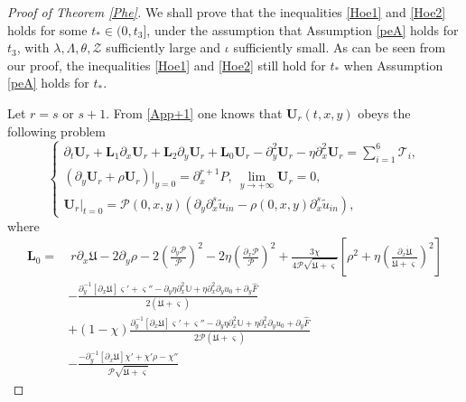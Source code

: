 \documentclass{amsart}
\numberwithin{equation}{section}
\begin{document}
\begin{proof}[Proof of Theorem \ref{Phe}]

We shall prove that the inequalities \eqref{Hoe1} and \eqref{Hoe2} holds for some $t_{*}\in (0,t_{3}]$, under the assumption that Assumption \ref{peA} holds for $t_{3}$, with $\lambda,\Lambda, \theta, \mathcal{Z}$ sufficiently large and $\iota$ sufficiently small. As can be seen from our proof, the inequalities \eqref{Hoe1} and \eqref{Hoe2} still hold for $t_{*}$ when Assumption \ref{peA} holds for $t_{*}$.

Let $r=s$ or $s+1$. From \eqref{App+1} one knows that $\mathbf{U}_{r}(t,x,y)$ obeys the following problem
\begin{equation}\label{Un}
\begin{cases}
\partial_{t}\mathbf{U}_{r}
+\mathbf{L}_{1}\partial_{x}\mathbf{U}_{r}
+\mathbf{L}_{2}\partial_{y}\mathbf{U}_{r}
+\mathbf{L}_{0}\mathbf{U}_{r}
-\partial_{y}^{2}\mathbf{U}_{r}
-\eta\partial_{x}^{2}\mathbf{U}_{r}
=\sum\limits_{i=1}^{6}\mathcal{T}_{i},\\
\left(\partial_{y}\mathbf{U}_{r}+\rho\mathbf{U}_{r}\right)|_{y=0}=\partial_{x}^{r+1}P,~
\lim\limits_{y\to+\infty} \mathbf{U}_{r}=0,\\
\mathbf{U}_{r}|_{t=0}=\mathcal{P}(0,x,y)(\partial_{y}\partial_{x}^{s}\tilde{u}_{in}-\rho(0,x,y)\partial_{x}^{s}\tilde{u}_{in}),
\end{cases}
\end{equation}
where
\begin{align*}
\mathbf{L}_{0}
=&~r\partial_{x}\mathfrak{U}-2\partial_{y}\rho
  -2\left(\frac{\partial_{y}\mathcal{P}}{\mathcal{P}}\right)^{2}-2\eta\left(\frac{\partial_{x}\mathcal{P}}{\mathcal{P}}\right)^{2}
  +\frac{3\chi}{4\mathcal{P}\sqrt{\dot{\mathfrak{U}}+\varsigma}}\left[\rho^{2}+\eta\left(\frac{\partial_{x}\dot{\mathfrak{U}}}{\dot{\mathfrak{U}}+\varsigma}\right)^{2}\right]\\
 &-\frac{\partial_{y}^{-1}\left[\partial_{x}\mathfrak{U}\right]\varsigma'+\varsigma''-\partial_{y}\eta\partial_{x}^{2}\mathbb{U}+\eta\partial_{x}^{2}\partial_{y}u_{0}+\partial_{y}\hat{F}}{2(\dot{\mathfrak{U}}+\varsigma)}\\
 &+(1-\chi)\frac{\partial_{y}^{-1}\left[\partial_{x}\mathfrak{U}\right]\varsigma'+\varsigma''-\partial_{y}\eta\partial_{x}^{2}\mathbb{U}+\eta\partial_{x}^{2}\partial_{y}u_{0}+\partial_{y}\hat{F}}{2\mathcal{P}(\dot{\mathfrak{U}}+\varsigma)}\\
 &-\frac{-\partial_{y}^{-1}[\partial_{x}\mathfrak{U}]\chi'+\chi'\rho-\chi''}{\mathcal{P}\sqrt{\dot{\mathfrak{U}}+\varsigma}}

\end{align*}
\end{proof}
\end{document}
